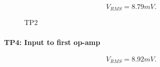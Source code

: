 \documentclass[12pt]{article}
\begin{document}
        \begin{equation}
          V_{RMS} = 8.79mV.\nonumber
        \end{equation}

        \begin{figure}[H]
          \centering
          \qquad
          \caption{TP2}
          \label{fig:tp2_waveforms}
        \end{figure}
        \setcounter{subfigure}{0}


      \newpage
      \paragraph{TP4: Input to first op-amp}

        \begin{equation}
          V_{RMS} = 8.92mV.\nonumber
        \end{equation}
\end{document}
